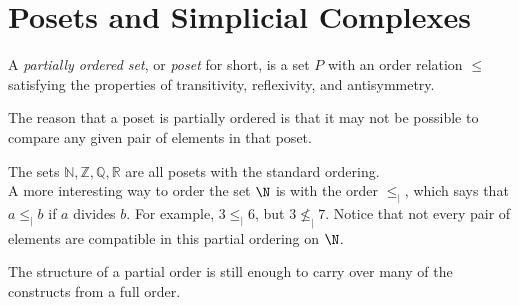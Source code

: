 
\section{Posets and Simplicial Complexes}

\begin{definition}
A \emph{partially ordered set}, or \emph{poset} for short, is a set $P$ with an order relation $\leq$ satisfying the properties of transitivity, reflexivity, and antisymmetry.
\end{definition}
The reason that a poset is partially ordered is that it may not be possible to compare any given pair of elements in that poset. 
\begin{example}
 The sets $\mathbb N,  \mathbb Z,  \mathbb Q,  \mathbb R$ are all posets with the standard ordering.\\
  A more interesting way to order the set $\N$ is with the order $\leq_|$,  which says that $a\leq_|b$ if $a$ divides $b$. For example,  $3\leq_|6$,  but $3\not\leq_|7$. Notice that not every pair of elements are compatible in this partial ordering on $\N$. 
\end{example}
The structure of a partial order is still enough to carry over many of the constructs from a full order. 

